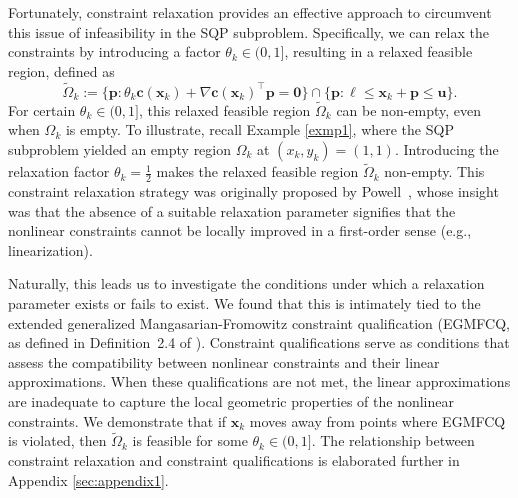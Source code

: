 \documentclass[aos]{imsart}
\numberwithin{equation}{section}
\theoremstyle{plain}
\begin{document}
Fortunately, constraint relaxation provides an effective approach to circumvent this issue of infeasibility in the SQP subproblem. Specifically, we can relax the constraints by introducing a factor $\theta_k \in (0,1]$, resulting in a relaxed feasible region, defined as
\begin{equation*}
    \widetilde{\Omega}_k := \{\bm{p}: \theta_k \bm{c}(\bm{x}_{k})+\nabla \bm{c}(\bm{x}_k)^{\top}\bm{p}=\bm{0}\} \cap \{\bm{p}: \bm{\ell} \leq \bm{x}_k + \bm{p} \leq \bm{u}\}.
\end{equation*}
For certain $\theta_k \in (0,1]$, this relaxed feasible region $ \widetilde{\Omega}_k$ can be non-empty, even when $\Omega_k$ is empty.
To illustrate, recall Example \ref{exmp1}, where the SQP subproblem yielded an empty region $\Omega_k$ at $(x_k,y_k) = (1,1)$. 
Introducing the relaxation factor $\theta_k = \frac{1}{2}$ makes the relaxed feasible region $\widetilde{\Omega}_k$ non-empty. 
This constraint relaxation strategy was originally proposed by Powell~\cite{powell2006fast}, whose insight was that the absence of a suitable relaxation parameter signifies that the nonlinear constraints cannot be locally improved in a first-order sense (e.g., linearization). 

Naturally, this leads us to investigate the conditions under which a relaxation parameter exists or fails to exist. 
We found that this is intimately tied to the extended generalized Mangasarian-Fromowitz constraint qualification (EGMFCQ, as defined in Definition~2.4 of \cite{xu2015smoothing}). 
Constraint qualifications serve as conditions that assess the compatibility between nonlinear constraints and their linear approximations. 
When these qualifications are not met, the linear approximations are inadequate to capture the local geometric properties of the nonlinear constraints. 
We demonstrate that if $\bm{x}_k$ moves away from points where EGMFCQ is violated, then $\widetilde{\Omega}_k$ is feasible for some $\theta_k \in (0,1]$. 
The relationship between constraint relaxation and constraint qualifications is elaborated further in Appendix \ref{sec:appendix1}.
\end{document}
